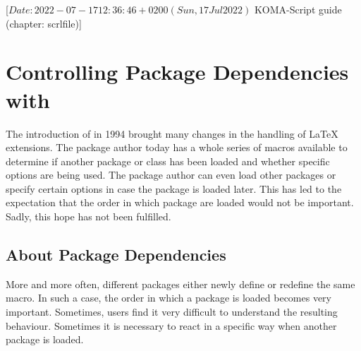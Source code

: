 %
%
%
%
%
%
%

                 [$Date: 2022-07-17 12:36:46 +0200 (Sun, 17 Jul 2022) $
                  KOMA-Script guide (chapter: scrlfile)]

\chapter{Controlling Package Dependencies with }
\BeginIndexGroup
{}

The introduction of \LaTeXe{} in 1994 brought many changes in the handling of
\LaTeX{} extensions. The package author today has a whole series of macros
available to determine if another package or class has been loaded and whether
specific options are being used. The package author can even load other
packages or specify certain options in case the package is loaded later. This
has led to the expectation that the order in which package are loaded would
not be important. Sadly, this hope has not been fulfilled.

\section{About Package Dependencies}
More and more often, different packages either newly define or redefine the
same macro. In such a case, the order in which a package is loaded becomes
very important. Sometimes, users find it very difficult to understand the
resulting behaviour. Sometimes it is necessary to react in a specific way when
another package is loaded.

